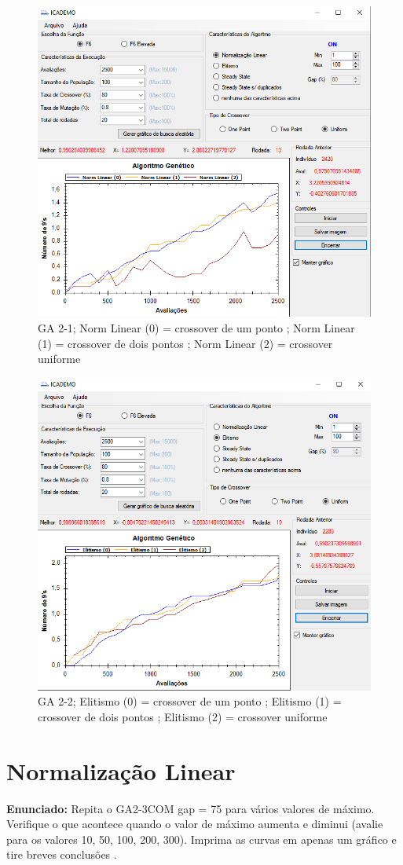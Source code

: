 \documentclass[12pt]{article}
\begin{document}
\begin{figure}[H]
	\centering
	\includegraphics[width=0.7\linewidth]{Imagens/questao6_1}
	\caption{GA 2-1; Norm Linear (0) = crossover de um ponto ; Norm Linear (1) = crossover de dois pontos ; Norm Linear (2) = crossover uniforme}
	\label{fig:questao61}
\end{figure}
\begin{figure}[H]
	\centering
	\includegraphics[width=0.7\linewidth]{Imagens/questao6_2}
	\caption{GA 2-2; Elitismo (0) = crossover de um ponto ; Elitismo (1) = crossover de dois pontos ; Elitismo (2) = crossover uniforme}
	\label{fig:questao62}
\end{figure}


\section{Normalização Linear}
\textbf{Enunciado:}
Repita o GA2-3COM gap = 75 para vários valores de máximo. Verifique o que acontece quando o valor de máximo aumenta e diminui (avalie para os valores 10, 50, 100, 200, 300). Imprima as curvas em apenas um gráfico e tire breves conclusões .
\end{document}

